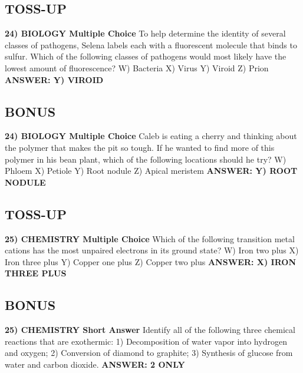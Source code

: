 \documentclass{article}
\begin{document}
\subsection*{TOSS-UP}
\textbf{24) BIOLOGY Multiple Choice} To help determine the identity of several classes of pathogens, Selena labels each with a fluorescent molecule that binds to sulfur. Which of the following classes of pathogens would most likely have the lowest amount of fluorescence?
\newline
W) Bacteria
\newline
X) Virus
\newline
Y) Viroid
\newline
Z) Prion
\newline
\textbf{ANSWER: Y) VIROID}

\subsection*{BONUS}
\textbf{24) BIOLOGY Multiple Choice} Caleb is eating a cherry and thinking about the polymer that makes the pit so tough. If he wanted to find more of this polymer in his bean plant, which of the following locations should he try?
\newline
W) Phloem
\newline
X) Petiole
\newline
Y) Root nodule
\newline
Z) Apical meristem
\newline
\textbf{ANSWER: Y) ROOT NODULE}

\subsection*{TOSS-UP}
\textbf{25) CHEMISTRY Multiple Choice} Which of the following transition metal cations has the most unpaired electrons in its ground state?
\newline
W) Iron two plus
\newline
X) Iron three plus
\newline
Y) Copper one plus
\newline
Z) Copper two plus
\newline
\textbf{ANSWER: X) IRON THREE PLUS}

\subsection*{BONUS}
\textbf{25) CHEMISTRY Short Answer} Identify all of the following three chemical reactions that are exothermic: 1) Decomposition of water vapor into hydrogen and oxygen; 2) Conversion of diamond to graphite; 3) Synthesis of glucose from water and carbon dioxide.
\newline
\textbf{ANSWER: 2 ONLY}
\end{document}
